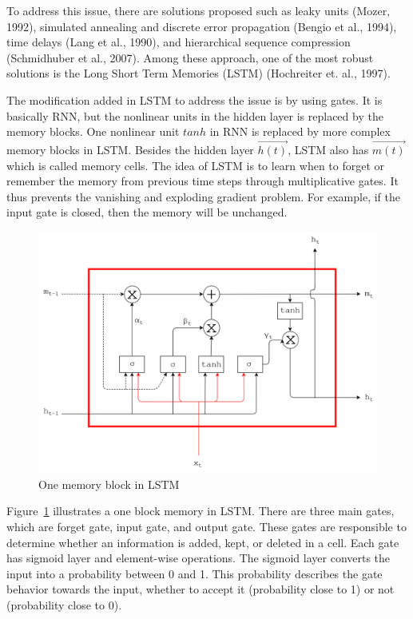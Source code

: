 To address this issue, there are solutions proposed such as leaky units (Mozer, 1992), simulated annealing and discrete error propagation (Bengio et al., 1994), time delays (Lang et al., 1990), and hierarchical sequence compression (Schmidhuber et al., 2007). Among these approach, one of the most robust solutions is the Long Short Term Memories (LSTM) (Hochreiter et. al., 1997). 

The modification added in LSTM to address the issue is by using gates. It is basically RNN, but the nonlinear units in the hidden layer is replaced by the memory blocks. One nonlinear unit $tanh$ in RNN is replaced by more complex memory blocks in LSTM. Besides the hidden layer $\vec{h(t)}$, LSTM also has $\vec{m(t)}$ which is called memory cells.  The idea of LSTM is to learn when to forget or remember the memory from previous time steps through multiplicative gates. It thus prevents the vanishing and exploding gradient problem. For example, if the input gate is closed, then the memory will be unchanged.

\begin{figure}
	\centering
	\includegraphics[width=1.0\linewidth]{images/lstm}
	\caption{One memory block in LSTM}
	\label{fig:lstm}
\end{figure}

Figure~\ref{fig:lstm} illustrates a one block memory in LSTM. There are three main gates, which are forget gate, input gate, and output gate. These gates are responsible to determine whether an information is added, kept, or deleted in a cell. Each gate has sigmoid layer and element-wise operations. The sigmoid layer converts the input into a probability between 0 and 1. This probability describes the gate behavior towards the input, whether to accept it (probability close to 1) or not (probability close to 0). 

